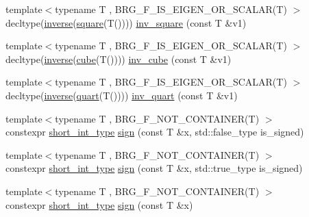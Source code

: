 \begin{DoxyCompactItemize}
{\footnotesize template$<$typename T , B\+R\+G\+\_\+\+F\+\_\+\+I\+S\+\_\+\+E\+I\+G\+E\+N\+\_\+\+O\+R\+\_\+\+S\+C\+A\+L\+A\+R(\+T) $>$ }\\decltype(\hyperlink{namespaceIceBRG_ab1443aa39081e660922881dd0d41f3f0}{inverse}(\hyperlink{namespaceIceBRG_acb41b216878b9fbfb640e4d952245454}{square}(T()))) \hyperlink{namespaceIceBRG_abf9f507b4cf165d2cb8da1b74b8d2659}{inv\+\_\+square} (const T \&v1)
\item 
{\footnotesize template$<$typename T , B\+R\+G\+\_\+\+F\+\_\+\+I\+S\+\_\+\+E\+I\+G\+E\+N\+\_\+\+O\+R\+\_\+\+S\+C\+A\+L\+A\+R(\+T) $>$ }\\decltype(\hyperlink{namespaceIceBRG_ab1443aa39081e660922881dd0d41f3f0}{inverse}(\hyperlink{namespaceIceBRG_a004e76de29014018d52a7e1960ec0379}{cube}(T()))) \hyperlink{namespaceIceBRG_a2f42d0fdbd7fc5aba3248dbc920fc545}{inv\+\_\+cube} (const T \&v1)
\item 
{\footnotesize template$<$typename T , B\+R\+G\+\_\+\+F\+\_\+\+I\+S\+\_\+\+E\+I\+G\+E\+N\+\_\+\+O\+R\+\_\+\+S\+C\+A\+L\+A\+R(\+T) $>$ }\\decltype(\hyperlink{namespaceIceBRG_ab1443aa39081e660922881dd0d41f3f0}{inverse}(\hyperlink{namespaceIceBRG_ad2c9ac76b2a0e4b14e2a18374dc1cb22}{quart}(T()))) \hyperlink{namespaceIceBRG_a75d2aad472c6d7ef535754be2f1ced8d}{inv\+\_\+quart} (const T \&v1)
\item 
{\footnotesize template$<$typename T , B\+R\+G\+\_\+\+F\+\_\+\+N\+O\+T\+\_\+\+C\+O\+N\+T\+A\+I\+N\+E\+R(\+T) $>$ }\\constexpr \hyperlink{lib_2IceBRG__main_2common_8h_a9a4c2c3afa89b73437fa1d63d607c7c1}{short\+\_\+int\+\_\+type} \hyperlink{namespaceIceBRG_aed6c1ff50448ae44b342bd1be9f27745}{sign} (const T \&x, std\+::false\+\_\+type is\+\_\+signed)
\item 
{\footnotesize template$<$typename T , B\+R\+G\+\_\+\+F\+\_\+\+N\+O\+T\+\_\+\+C\+O\+N\+T\+A\+I\+N\+E\+R(\+T) $>$ }\\constexpr \hyperlink{lib_2IceBRG__main_2common_8h_a9a4c2c3afa89b73437fa1d63d607c7c1}{short\+\_\+int\+\_\+type} \hyperlink{namespaceIceBRG_a76091edf55c9e911511b09f5fe8fda81}{sign} (const T \&x, std\+::true\+\_\+type is\+\_\+signed)
\item 
{\footnotesize template$<$typename T , B\+R\+G\+\_\+\+F\+\_\+\+N\+O\+T\+\_\+\+C\+O\+N\+T\+A\+I\+N\+E\+R(\+T) $>$ }\\constexpr \hyperlink{lib_2IceBRG__main_2common_8h_a9a4c2c3afa89b73437fa1d63d607c7c1}{short\+\_\+int\+\_\+type} \hyperlink{namespaceIceBRG_a28283204e50f408fb1c5e6312981c1ab}{sign} (const T \&x)

\end{DoxyCompactItemize}
